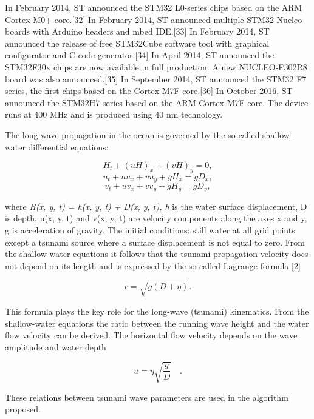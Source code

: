 \documentclass{aip-cp}
\begin{document}
In February 2014, ST announced the STM32 L0-series chips based on the ARM Cortex-M0+ core.[32]
In February 2014, ST announced multiple STM32 Nucleo boards with Arduino headers and mbed IDE.[33]
In February 2014, ST announced the release of free STM32Cube software tool with graphical configurator and C code generator.[34]
In April 2014, ST announced the STM32F30x chips are now available in full production. A new NUCLEO-F302R8 board was also announced.[35]
In September 2014, ST announced the STM32 F7 series, the first chips based on the Cortex-M7F core.[36]
In October 2016, ST announced the STM32H7 series based on the ARM Cortex-M7F core. The device runs at 400 MHz and is produced using 40 nm technology.



The long wave propagation in the ocean is governed by the so-called 
shallow-water differential equations:

\[
H_t + (uH)_x + (vH)_y = 0,
\]
\begin{equation}
\label{eq1}
u_t + uu_x + vu_y + gH_x = gD_x ,
\end{equation}
\[
v_t + uv_x + vv_y + gH_y = gD_y ,
\]

\noindent
where \textit{H(x, y, t) = h(x, y, t) + D(x, y, t), h} is the water surface displacement, D is depth, u(x, y, t) and v(x, y, 
t) are velocity components along the axes x and y, g is acceleration of 
gravity. The initial conditions: still water at all grid points except a 
tsunami source where a surface displacement is not equal to zero. From the 
shallow-water equations it follows that the tsunami propagation velocity 
does not depend on its length and is expressed by the so-called Lagrange 
formula [2]

\begin{equation}
\label{eq2}
c = \sqrt {g(D + \eta )} .
\end{equation}

This formula plays the key role for the long-wave (tsunami) kinematics. From 
the shallow-water equations the ratio between the running wave height and 
the water flow velocity can be derived. The horizontal flow velocity depends 
on the wave amplitude and water depth

\begin{equation}
\label{eq3}
u = \eta \sqrt {\frac{g}{D}} \quad .
\end{equation}

These relations between tsunami wave parameters are used in the algorithm 
proposed.
\end{document}

